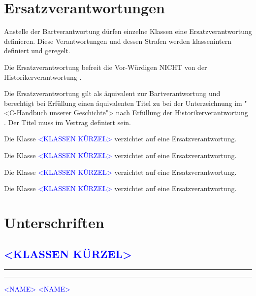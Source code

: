 \documentclass[fontsize=12pt,parskip=half]{scrartcl}
\begin{document}
\section{Ersatzverantwortungen}
\begin{contract}
  \Clause[title={Ersatzverantwortung}]\label{ersatz}
  Anstelle der Bartverantwortung dürfen einzelne Klassen eine Ersatzverantwortung definieren. Diese Verantwortungen und dessen Strafen werden klassenintern
  definiert und geregelt.

  Die Ersatzverantwortung befreit die Vor-Würdigen NICHT von der Historikerverantwortung .

  Die Ersatzverantwortung gilt als äquivalent zur Bartverantwortung und berechtigt bei Erfüllung einen äquivalenten Titel zu  bei der Unterzeichnung
  im "<C-Handbuch unserer Geschichte"> nach Erfüllung der Historikerverantwortung . Der Titel muss im Vertrag definiert sein.

  \parnumberfalse
  [\textcolor{blue}{
      DIESEN ABSATZ löschen beim editiern.
      Für Beispiele von ERSATZVERANTWORUNGEN siehe Vertrag von 2025 in aktuller Form und im Git-History}]
  \parnumbertrue

  \Clause[title={Klasse \textcolor{blue}{<KLASSEN KÜRZEL>}}]
  Die Klasse \textcolor{blue}{<KLASSEN KÜRZEL>} verzichtet auf eine Ersatzverantwortung.

  \Clause[title={Klasse \textcolor{blue}{<KLASSEN KÜRZEL>}}]
  Die Klasse \textcolor{blue}{<KLASSEN KÜRZEL>} verzichtet auf eine Ersatzverantwortung.

  \Clause[title={Klasse \textcolor{blue}{<KLASSEN KÜRZEL>}}]
  Die Klasse \textcolor{blue}{<KLASSEN KÜRZEL>} verzichtet auf eine Ersatzverantwortung.

  \Clause[title={Klasse \textcolor{blue}{<KLASSEN KÜRZEL>}}]
  Die Klasse \textcolor{blue}{<KLASSEN KÜRZEL>} verzichtet auf eine Ersatzverantwortung.
\end{contract}


\pagebreak
\section{Unterschriften}

\subsection*{\textcolor{blue}{<KLASSEN KÜRZEL>}}
\vspace{50pt}
\noindent\rule{7cm}{.4pt}\hfill\rule{7cm}{.4pt}\par
\noindent \textcolor{blue}{<NAME>} \hfill\textcolor{blue}{<NAME>}
\end{document}
